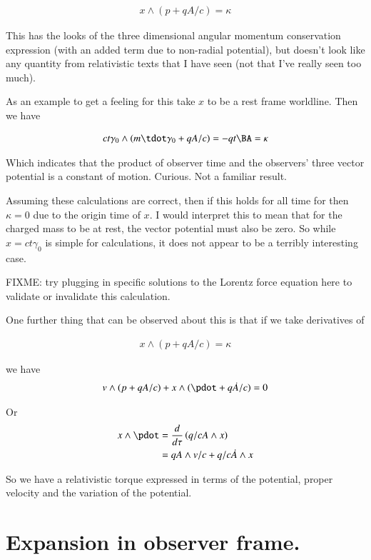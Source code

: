 \begin{align*}
x \wedge (p + qA/c ) = \kappa
\end{align*}

This has the looks of the three dimensional angular momentum conservation expression (with an added term due to non-radial potential),
but doesn't look like any quantity from relativistic texts that I have seen (not that I've really seen too much).

As an example to get a feeling for this take $x$ to be a rest frame worldline.  Then we have

\begin{align}
c t \gamma_0 \wedge ( m \tdot \gamma_0 + qA/c ) = -q t \BA = \kappa
\end{align}

Which indicates that the product of observer time and the observers' three vector potential is a constant of motion.  Curious.  Not a familiar result.

Assuming these calculations are correct, then if this holds for all time for then $\kappa =0$ due to the origin time of $x$.
I would interpret this to mean that for the charged mass to be at rest, the vector potential must also be zero.  So while $x = ct\gamma_0$ 
is simple for calculations, it does not appear to be a terribly interesting case.

FIXME: try plugging in specific solutions to the Lorentz force equation here to validate or invalidate this calculation.

One further thing that can be observed about this is that if we take derivatives of

\begin{align*}
x \wedge (p + qA/c ) = \kappa
\end{align*}

we have
\begin{align*}
v \wedge (p + qA/c ) + x \wedge (\pdot + q\dot{A}/c ) = 0
\end{align*}

Or
\begin{align}\label{eqn:noethers_lorentz_force:noethersLxTx}
x \wedge \pdot &= \frac{d}{d\tau} \left( q/c A \wedge x \right) \\
&= qA \wedge v/c + q/c \dot{A} \wedge x 
\end{align}

So we have a relativistic torque expressed in terms of the potential, proper velocity and the variation of the potential.

\section{Expansion in observer frame. } 

